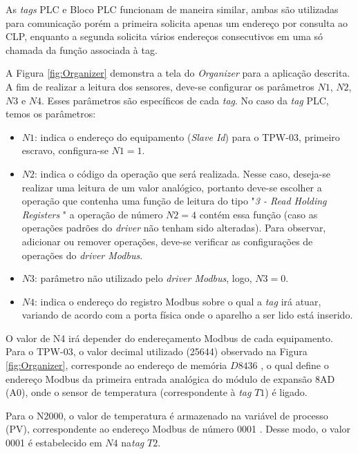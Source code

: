 As \textit{tags} PLC e Bloco PLC funcionam de maneira similar, ambas são utilizadas para comunicação porém a primeira solicita apenas um endereço por consulta ao CLP, enquanto a segunda solicita vários endereços consecutivos em uma só chamada da função associada à tag.


A Figura \ref{fig:Organizer} demonstra a tela do \textit{Organizer} para a aplicação descrita. A fim de realizar a leitura dos sensores, deve-se configurar os parâmetros $N1$, $N2$, $N3$ e $N4$. Esses parâmetros são específicos de cada \textit{tag}. No caso da \textit{tag} PLC, temos os parâmetros:

\begin{itemize}
    \item $N1$: indica o endereço do equipamento (\textit{Slave Id}) para o TPW-03, primeiro escravo, configura-se $N1 = 1$.
    \item $N2$: indica o código da operação que será realizada. Nesse caso, deseja-se realizar uma leitura de um valor analógico, portanto deve-se escolher a operação que contenha uma função de leitura do tipo "\textit{3 - Read Holding Registers }" a operação de número $N2 = 4$ contém essa função (caso as operações padrões do \textit{driver} não tenham sido alteradas). Para observar, adicionar ou remover operações, deve-se verificar as configurações de operações do \textit{driver Modbus}.
    \item $N3$: parâmetro não utilizado pelo \textit{driver Modbus}, logo, $N3 = 0$.
    \item $N4$: indica o endereço do registro Modbus sobre o qual a \textit{tag} irá atuar, variando de acordo com a porta física onde o aparelho a ser lido está inserido.
\end{itemize}

O valor de N4 irá depender do endereçamento Modbus de cada equipamento. Para o TPW-03, o valor decimal utilizado (25644) observado na Figura \ref{fig:Organizer}, corresponde ao endereço de memória $D8436$ \cite{weg2010manualinstalacao}, o qual define o endereço Modbus da primeira entrada analógica do módulo de expansão 8AD (A0), onde o sensor de temperatura (correspondente à \textit{tag} $T1$) é ligado. 

Para o N2000, o valor de temperatura é armazenado na variável de processo (PV), correspondente ao endereço Modbus de número 0001 \cite{novus2014modbus}. Desse modo, o valor 0001 é estabelecido em $N4$ na\textit{tag} $T2$.

